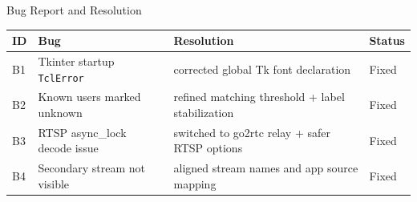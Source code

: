 \documentclass[10pt]{beamer}
\begin{document}
\begin{frame}{Bug Report and Resolution}
\footnotesize
\begin{center}
\begin{tabular}{|p{0.9cm}|p{3.2cm}|p{4.1cm}|p{1.1cm}|}
\hline
\textbf{ID} & \textbf{Bug} & \textbf{Resolution} & \textbf{Status} \\ \hline
B1 & Tkinter startup \texttt{TclError} & corrected global Tk font declaration & Fixed \\ \hline
B2 & Known users marked unknown & refined matching threshold + label stabilization & Fixed \\ \hline
B3 & RTSP async\_lock decode issue & switched to go2rtc relay + safer RTSP options & Fixed \\ \hline
B4 & Secondary stream not visible & aligned stream names and app source mapping & Fixed \\ \hline
\end{tabular}
\end{center}
\normalsize
\end{frame}
\end{document}

